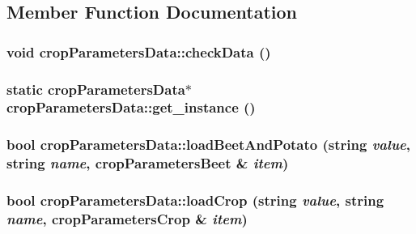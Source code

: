\subsection{Member Function Documentation}
\hypertarget{classcrop_parameters_data_abb7dc6734952ed17bc075cc4b18b3c09}{
\subsubsection[{checkData}]{\setlength{\rightskip}{0pt plus 5cm}void cropParametersData::checkData ()}}
\label{classcrop_parameters_data_abb7dc6734952ed17bc075cc4b18b3c09}
\hypertarget{classcrop_parameters_data_aafb0367069f7e133090adc2da39bf903}{
\subsubsection[{get\_\-instance}]{\setlength{\rightskip}{0pt plus 5cm}static {\bf cropParametersData}$\ast$ cropParametersData::get\_\-instance ()}}
\label{classcrop_parameters_data_aafb0367069f7e133090adc2da39bf903}
\hypertarget{classcrop_parameters_data_a3cc0a5921d5184ba7913d1569dc28dcc}{
\subsubsection[{loadBeetAndPotato}]{\setlength{\rightskip}{0pt plus 5cm}bool cropParametersData::loadBeetAndPotato (string {\em value}, \/  string {\em name}, \/  {\bf cropParametersBeet} \& {\em item})}}
\label{classcrop_parameters_data_a3cc0a5921d5184ba7913d1569dc28dcc}
\hypertarget{classcrop_parameters_data_a3054f915f09e2911f88d396dd5b25ac6}{
\subsubsection[{loadCrop}]{\setlength{\rightskip}{0pt plus 5cm}bool cropParametersData::loadCrop (string {\em value}, \/  string {\em name}, \/  {\bf cropParametersCrop} \& {\em item})}}
